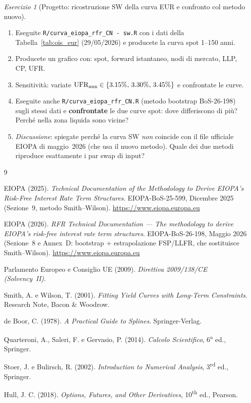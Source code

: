 \documentclass[11pt,a4paper]{article}
\theoremstyle{plain}
\theoremstyle{definition}
\theoremstyle{remark}
\newtheorem{esercizio}{Esercizio}[section]
\newcommand{\UFR}{\mathrm{UFR}}
\begin{document}
\begin{esercizio}[Progetto: ricostruzione SW della curva EUR e confronto col metodo nuovo]
\begin{enumerate}[label=(\alph*)]
  \item Eseguite \texttt{R/curva\_eiopa\_rfr\_CN\ -\ sw.R} con i dati della
        Tabella~\ref{tab:ois_eur} (29/05/2026) e producete la curva spot 1--150 anni.
  \item Producete un grafico con: spot, forward istantaneo, nodi di mercato, LLP, CP, UFR.
  \item Sensitivit\`a: variate $\UFR_{\rm ann} \in \{3.15\%,\,3.30\%,\,3.45\%\}$ e
        confrontate le curve.
  \item Eseguite anche \texttt{R/curva\_eiopa\_rfr\_CN.R} (metodo bootstrap BoS-26-198)
        sugli stessi dati e \textbf{confrontate} le due curve spot: dove differiscono
        di più? Perché nella zona liquida sono vicine?
  \item \emph{Discussione}: spiegate perché la curva SW \emph{non} coincide con il file
        ufficiale EIOPA di maggio~2026 (che usa il nuovo metodo). Quale dei due metodi
        riproduce esattamente i par swap di input?
\end{enumerate}
\end{esercizio}

\renewcommand{\refname}{Riferimenti bibliografici}
\begin{thebibliography}{9}

EIOPA (2025).
\textit{Technical Documentation of the Methodology to Derive EIOPA's
Risk-Free Interest Rate Term Structures}.
EIOPA-BoS-25-599, Dicembre 2025 (Sezione~9, metodo Smith--Wilson).
\url{https://www.eiopa.europa.eu}

EIOPA (2026).
\textit{RFR Technical Documentation --- The methodology to derive EIOPA's
risk-free interest rate term structures}.
EIOPA-BoS-26-198, Maggio 2026 (Sezione~8 e Annex~D: bootstrap + estrapolazione
FSP/LLFR, che sostituisce Smith--Wilson).
\url{https://www.eiopa.europa.eu}

Parlamento Europeo e Consiglio UE (2009).
\textit{Direttiva 2009/138/CE (Solvency~II)}.

Smith, A. e Wilson, T. (2001).
\textit{Fitting Yield Curves with Long-Term Constraints}.
Research Note, Bacon \& Woodrow.

de Boor, C. (1978).
\textit{A Practical Guide to Splines}.
Springer-Verlag.

Quarteroni, A., Saleri, F. e Gervasio, P. (2014).
\textit{Calcolo Scientifico}, 6\textsuperscript{a} ed., Springer.

Stoer, J. e Bulirsch, R. (2002).
\textit{Introduction to Numerical Analysis}, 3\textsuperscript{rd} ed., Springer.

Hull, J. C. (2018).
\textit{Options, Futures, and Other Derivatives}, 10\textsuperscript{th} ed., Pearson.

\end{thebibliography}
\end{document}
